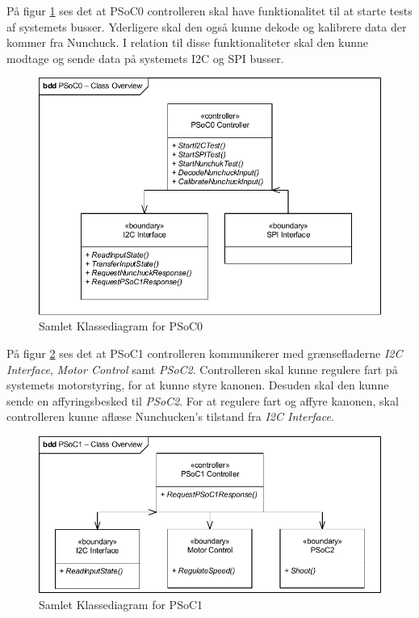 På figur \ref{fig:CompleteClassDiagramPSoC0} ses det at PSoC0 controlleren skal have funktionalitet til at starte tests af systemets busser. Yderligere skal den også kunne dekode og kalibrere data der kommer fra Nunchuck. I relation til disse funktionaliteter skal den kunne modtage og sende data på systemets I2C og SPI busser.

\begin{figure}[H]
	\centering
	\includegraphics[width=\textwidth] {Systemarkitektur/images/CompleteClassDiagramPSoC0}
	\caption{Samlet Klassediagram for PSoC0}
	\label{fig:CompleteClassDiagramPSoC0}
\end{figure}

På figur \ref{fig:CompleteClassDiagramPSoC1} ses det at PSoC1 controlleren kommunikerer med grænsefladerne \textit{I2C Interface}, \textit{Motor Control} samt \textit{PSoC2}. Controlleren skal kunne regulere fart på systemets motorstyring, for at kunne styre kanonen. Desuden skal den kunne sende en affyringsbesked til \textit{PSoC2}. For at regulere fart og affyre kanonen, skal controlleren kunne aflæse Nunchucken's tilstand fra \textit{I2C Interface}.
\begin{figure}[H]
	\centering
	\includegraphics[width=\textwidth] {Systemarkitektur/images/CompleteClassDiagramPSoC1}
	\caption{Samlet Klassediagram for PSoC1}
	\label{fig:CompleteClassDiagramPSoC1}
\end{figure}

